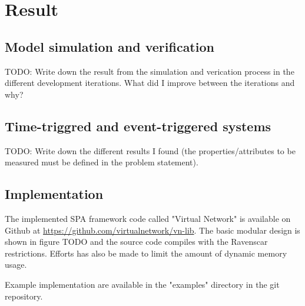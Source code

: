 \chapter{Result}\label{ch:result}
\section{Model simulation and verification}
TODO: Write down the result from the simulation and verication process in the
different development iterations. What did I improve between the iterations and
why?

\section{Time-triggred and event-triggered systems}
TODO: Write down the different results I found (the properties/attributes to be
measured must be defined in the problem statement).

\section{Implementation}
The implemented SPA framework code called "Virtual Network" is available on
Github at \url{https://github.com/virtualnetwork/vn-lib}. The basic modular
design is shown in figure TODO and the source code compiles with the Ravenscar
restrictions. Efforts has also be made to limit the amount of dynamic memory
usage.

Example implementation are available in the "examples" directory in the git
repository.
